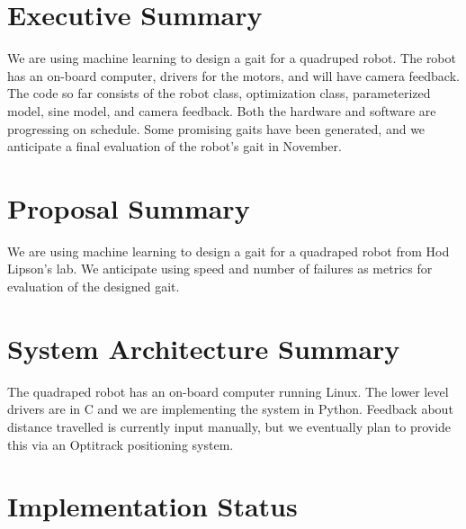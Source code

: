 \section{Executive Summary}

We are using machine learning to design a gait for a quadruped
robot. The robot has an on-board computer, drivers for the motors, and
will have camera feedback. The code so far consists of the robot
class, optimization class, parameterized model, sine model, and camera
feedback.  Both the hardware and software are progressing on schedule.
Some promising gaits have been generated, and we anticipate a final
evaluation of the robot’s gait in November.



\section{Proposal Summary}

We are using machine learning to design a gait for a quadraped robot
from Hod Lipson’s lab. We anticipate using speed and number of
failures as metrics for evaluation of the designed gait.



\section{System Architecture Summary}

The quadraped robot has an on-board computer running Linux. The lower
level drivers are in C and we are implementing the system in
Python. Feedback about distance travelled is currently input manually,
but we eventually plan to provide this via an Optitrack positioning
system.



\section{Implementation Status}




